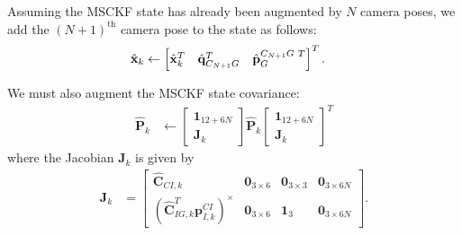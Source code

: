 \documentclass[letterpaper, 10 pt, conference]{ieeeconf}  %
\def\Vec#1{\mathbf{#1}}
\newcommand{\bbm}{\begin{bmatrix}}
\newcommand{\ebm}{\end{bmatrix}}
\begin{document}
Assuming the MSCKF state has already been augmented by $N$ camera poses, we add the $\left(N+1\right)^\text{th}$ camera pose to the state as follows:
\begin{align}
    \hat{\Vec{x}}_k &\leftarrow \bbm \hat{\Vec{x}}_k^T & \hat{\Vec{q}}_{C_{N+1} G}^T & \hat{\Vec{p}}_G^{C_{N+1} G \hspace{0.3em} T} \ebm^T .
\end{align}

We must also augment the MSCKF state covariance:
\begin{align}
    \hat{\Vec{P}}_k &\leftarrow \bbm \Vec{1}_{12+6N} \\ \Vec{J}_k \ebm \hat{\Vec{P}}_k \bbm \Vec{1}_{12+6N} \\ \Vec{J}_k \ebm^T
\end{align}
where the Jacobian $\Vec{J}_k$ is given by
\begin{align}
\Vec{J}_k &= \bbm \hat{\Vec{C}}_{C I, k} & \Vec{0}_{3\times6} & \Vec{0}_{3\times3} & \Vec{0}_{3\times6N} \\
                            \left(\hat{\Vec{C}}_{I G, k}^T \Vec{p}_{I,k}^{CI}\right)^\times & \Vec{0}_{3\times6} & \Vec{1}_3 & \Vec{0}_{3\times6N}
                \ebm .
\end{align}
\end{document}
